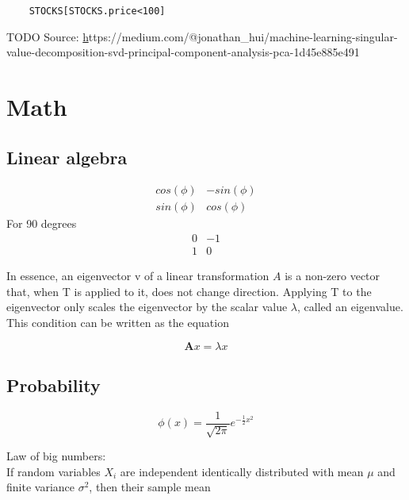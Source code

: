 \documentclass{article}
\begin{document}
\begin{lstlisting}
    STOCKS[STOCKS.price<100]
\end{lstlisting}

TODO
\small Source: \href{https://medium.com/@jonathan_hui/machine-learning-singular-value-decomposition-svd-principal-component-analysis-pca-1d45e885e491}https://medium.com/@jonathan\_hui/machine-learning-singular-value-decomposition-svd-principal-component-analysis-pca-1d45e885e491

\section{Math}

\subsection{Linear algebra}

\[
    \begin{matrix} 
        cos(\phi) & -sin(\phi) \\
        sin(\phi) & cos(\phi)
    \end{matrix}    
\]
For 90 degrees 
\[
    \begin{matrix} 
        0 & -1 \\
        1 & 0
    \end{matrix}    
\]

In essence, an eigenvector v of a linear transformation $A$
is a non-zero vector that, when T is applied to it, does not change direction. 
Applying T to the eigenvector only scales the eigenvector by the scalar value $\lambda$, 
called an eigenvalue. This condition can be written as the equation

\[ \mathbf{A}x=\lambda x\]

\subsection{Probability}


\[
    \phi (x)=\frac {1}{\sqrt {2\pi }} e^{-\frac {1}{2} x^2}
\]

Law of big numbers:\\
If random variables $X_i$ are independent identically distributed with mean $\mu$ and finite variance $\sigma^2$, then 
their sample mean
\end{document}
